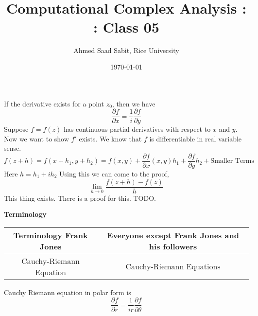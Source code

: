 \documentclass[letter]{article}
\title{Computational Complex Analysis : : Class 05}
\author{Ahmed Saad Sabit, Rice University}
\date{\today}
\begin{document}
\maketitle
	If the derivative exists for a point $z_0$, then we have \[
	\frac{\partial f}{\partial x} = \frac{1}{i} \frac{\partial f}{\partial y}
	\] 
	Suppose $f=f(z)$ has continuous partial derivatives with respect to $x$ and $y$. Now we want to show $f'$ exists. We know that $f$ is differentiable in real variable sense. 
	\[
	f(z+h) = f(x+h_1,y+h_2) = f(x,y) + \frac{\partial f}{\partial x} (x,y)h_1 + \frac{\partial f}{\partial y} h_2 + \text{Smaller Terms}
	\] 
	Here $h = h_1 + ih_2$ Using this we can come to the proof, 
	\[
		\lim_{h \to 0} \frac{f(z+h) - f(z)}{h} 	
	\] This thing exists. There is a proof for this. TODO. 

\textbf{Terminology} 
\begin{table}[htpb]
	\centering
	\label{tab:label}
	\begin{tabular}{c|c}
	\textbf{Terminology} 
	\textbf{Frank Jones} & \textbf{Everyone except Frank Jones and his followers} \\ \hline
	Cauchy-Riemann Equation & Cauchy-Riemann Equations
	\end{tabular}
\end{table}

Cauchy Riemann equation in polar form is 
\[
\frac{\partial f}{\partial r} = \frac{1}{i r} \frac{ \partial f}{\partial \theta}
\]
\end{document}
